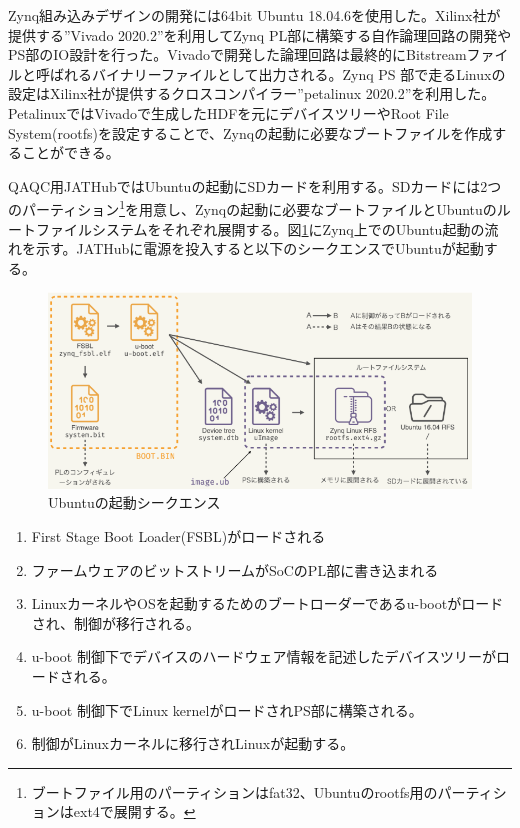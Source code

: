 Zynq組み込みデザインの開発には64bit Ubuntu 18.04.6を使用した。Xilinx社が提供する”Vivado 2020.2”を利用してZynq PL部に構築する自作論理回路の開発やPS部のIO設計を行った。Vivadoで開発した論理回路は最終的にBitstreamファイルと呼ばれるバイナリーファイルとして出力される。Zynq PS 部で走るLinuxの設定はXilinx社が提供するクロスコンパイラー”petalinux 2020.2”を利用した。PetalinuxではVivadoで生成したHDFを元にデバイスツリーやRoot File System(rootfs)を設定することで、Zynqの起動に必要なブートファイルを作成することができる。\par
QAQC用JATHubではUbuntuの起動にSDカードを利用する。SDカードには2つのパーティション\footnote{ブートファイル用のパーティションはfat32、Ubuntuのrootfs用のパーティションはext4で展開する。}を用意し、Zynqの起動に必要なブートファイルとUbuntuのルートファイルシステムをそれぞれ展開する。図\ref{JATHubboot}にZynq上でのUbuntu起動の流れを示す\cite{mt_okazaki}。JATHubに電源を投入すると以下のシークエンスでUbuntuが起動する。

\begin{figure} 
\centering
\includegraphics[width=16cm]{fig/QAQC/JATHubboot.png}
\caption[Ubuntuの起動シークエンス]{Ubuntuの起動シークエンス}
\label{JATHubboot}
\end{figure}

\begin{enumerate}
    \item First Stage Boot Loader(FSBL)がロードされる
    \item ファームウェアのビットストリームがSoCのPL部に書き込まれる
    \item LinuxカーネルやOSを起動するためのブートローダーであるu-bootがロードされ、制御が移行される。
    \item u-boot 制御下でデバイスのハードウェア情報を記述したデバイスツリーがロードされる。
    \item u-boot 制御下でLinux kernelがロードされPS部に構築される。
    \item 制御がLinuxカーネルに移行されLinuxが起動する。
\end{enumerate}


